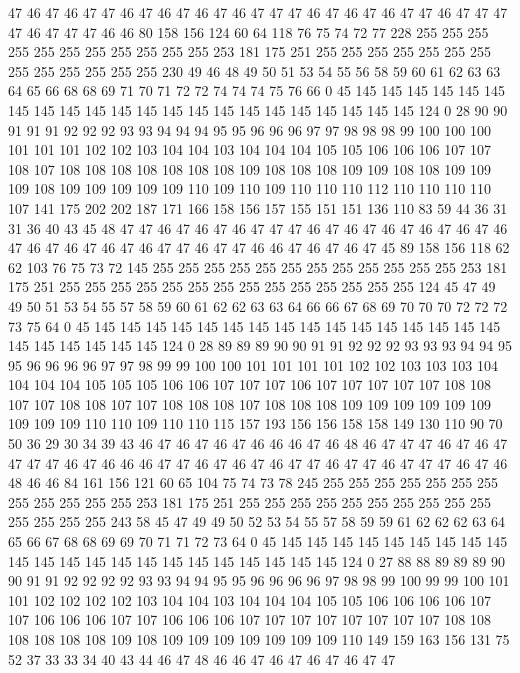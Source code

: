 47 46 47 46 47 47 46 47 46 47 46 47 46 47 47 47 46 47 46 47
46 47 47 46 47 47 47 47 46 47 47 47 46 46 80 158 156 124 60 64
118 76 75 74 72 77 228 255 255 255 255 255 255 255 255 255 255 255 253 181
175 251 255 255 255 255 255 255 255 255 255 255 255 255 255 230 49 46 48 49
50 51 53 54 55 56 58 59 60 61 62 63 63 64 65 66 68 68 69 71
70 71 72 72 74 74 74 75 76 66 0 45 145 145 145 145 145 145 145 145
145 145 145 145 145 145 145 145 145 145 145 145 145 145 124 0 28 90 90 91
91 91 92 92 92 93 93 94 94 94 95 95 96 96 96 97 97 98 98 98
99 100 100 100 101 101 101 102 102 103 104 104 103 104 104 104 105 105 106 106
106 107 107 108 107 108 108 108 108 108 108 108 109 108 108 108 109 109 108 108
109 109 109 108 109 109 109 109 109 110 109 110 109 110 110 110 112 110 110 110
110 107 141 175 202 202 187 171 166 158 156 157 155 151 151 136 110 83 59 44
36 31 31 36 40 43 45 48 47 47 46 47 46 47 46 47 47 47 46 47
46 47 46 47 46 47 46 47 46 47 46 47 46 47 46 47 46 47 47 46
47 47 46 46 47 46 47 46 47 45 89 158 156 118 62 62 103 76 75 73
72 145 255 255 255 255 255 255 255 255 255 255 255 255 253 181 175 251 255 255
255 255 255 255 255 255 255 255 255 255 255 255 124 45 47 49 49 50 51 53
54 55 57 58 59 60 61 62 62 63 63 64 66 66 67 68 69 70 70 70
72 72 72 73 75 64 0 45 145 145 145 145 145 145 145 145 145 145 145 145
145 145 145 145 145 145 145 145 145 145 124 0 28 89 89 89 90 90 91 91
92 92 92 93 93 93 94 94 95 95 96 96 96 96 97 97 98 99 99 100
100 101 101 101 101 102 102 103 103 103 104 104 104 104 105 105 105 106 106 107
107 107 106 107 107 107 107 107 108 108 107 107 108 108 107 107 108 108 108 107
108 108 108 109 109 109 109 109 109 109 109 109 110 110 109 110 110 115 157 193
156 156 158 158 149 130 110 90 70 50 36 29 30 34 39 43 46 47 46 47
46 47 46 46 46 47 46 48 46 47 47 47 46 47 46 47 47 47 47 46
47 46 46 46 47 47 46 47 46 47 46 47 47 46 47 47 46 47 47 47
46 47 46 48 46 46 84 161 156 121 60 65 104 75 74 73 78 245 255 255
255 255 255 255 255 255 255 255 255 255 253 181 175 251 255 255 255 255 255 255
255 255 255 255 255 255 255 255 243 58 45 47 49 49 50 52 53 54 55 57
58 59 59 61 62 62 62 63 64 65 66 67 68 68 69 69 70 71 71 72
73 64 0 45 145 145 145 145 145 145 145 145 145 145 145 145 145 145 145 145
145 145 145 145 145 145 124 0 27 88 88 89 89 89 90 90 91 91 92 92
92 92 93 93 94 94 95 95 96 96 96 96 97 98 98 99 100 99 99 100
101 101 102 102 102 102 103 104 104 103 104 104 104 105 105 106 106 106 106 107
107 106 106 106 107 107 106 106 106 107 107 107 107 107 107 107 107 108 108 108
108 108 108 109 108 109 109 109 109 109 109 109 110 149 159 163 156 131 75 52
37 33 33 34 40 43 44 46 47 48 46 46 47 46 47 46 47 46 47 47
